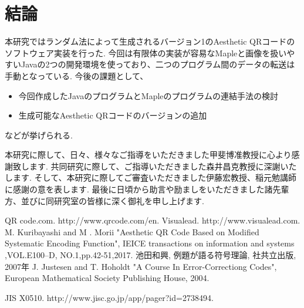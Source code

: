 \documentclass{thesis}
\begin{document}
 


\chapter{結論}
\label{chap:5}

本研究ではランダム法によって生成されるバージョン1のAesthetic QRコードのソフトウェア実装を行った.
今回は有限体の実装が容易なMapleと画像を扱いやすいJavaの2つの開発環境を使っており、二つのプログラム間のデータの転送は手動となっている.
今後の課題として、
\begin{itemize}
\setlength{\itemsep}{5mm}
 \item 今回作成したJavaのプログラムとMapleのプログラムの連結手法の検討
 \item 生成可能なAesthetic QRコードのバージョンの追加
 \end{itemize}
などが挙げられる.


\acknowledgement

本研究に際して、日々、様々なご指導をいただきました甲斐博准教授に心より感謝致します.
共同研究に際して、ご指導いただきました森井昌克教授に深謝いたします.
そして、本研究に際してご審査いただきました伊藤宏教授、稲元勉講師に感謝の意を表します.
最後に日頃から助言や励ましをいただきました諸先輩方、並びに同研究室の皆様に深く御礼を申し上げます.


\begin{thebibliography}{99}

%
QR code.com. http://www.qrcode.com/en.
%
Visualead. http://www.visualead.com.
%
M. Kuribayashi and M . Morii "Aesthetic QR Code Based on Modified Systematic Encoding Function",
IEICE transactions on information and systems ,VOL.E100–D, NO.1,pp.42-51,2017.
%
池田和興, 例題が語る符号理論, 社共立出版, 2007年
%
J. Justesen and T. Hoholdt "A Course In Error-Correctiong Codes",
European Mathematical Society Publishing House, 2004.

%
%

JIS X0510. http://www.jisc.go.jp/app/pager?id=2738494. 
\end{thebibliography}

\appendix
\end{document}
